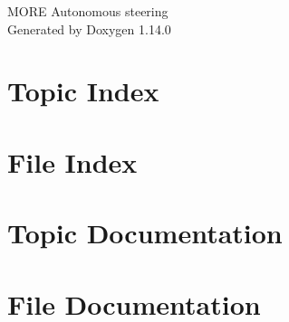 \documentclass[twoside]{book}
\newcommand{\+}{\discretionary{\mbox{\scriptsize$\hookleftarrow$}}{}{}}
\newcommand{\clearemptydoublepage}{%
    \newpage{\pagestyle{empty}\cleardoublepage}%
  }
\begin{document}
  \raggedbottom
    \hypersetup{pageanchor=false,
                bookmarksnumbered=true,
                pdfencoding=unicode
               }
  \begin{titlepage}
  \vspace*{7cm}
  \begin{center}%
  {\Large MORE Autonomous steering}\\
  \vspace*{1cm}
  {\large Generated by Doxygen 1.14.0}\\
  \end{center}
  \end{titlepage}
  \clearemptydoublepage
  \tableofcontents
  \clearemptydoublepage
  \hypersetup{pageanchor=true}
\chapter{Topic Index}

\chapter{File Index}

\chapter{Topic Documentation}

\chapter{File Documentation}















  \backmatter
  \newpage
  \clearemptydoublepage
  \printindex
\end{document}
